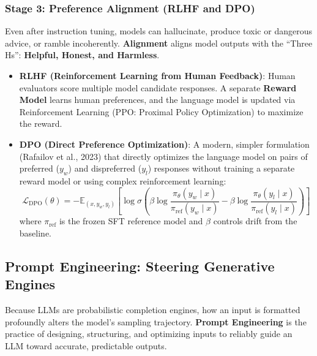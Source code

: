 \subsubsection{Stage 3: Preference Alignment (RLHF and DPO)}
Even after instruction tuning, models can hallucinate, produce toxic or dangerous advice, or ramble incoherently. \textbf{Alignment} aligns model outputs with the ``Three Hs'': \textbf{Helpful, Honest, and Harmless}.
\begin{itemize}
    \item \textbf{RLHF (Reinforcement Learning from Human Feedback)}: Human evaluators score multiple model candidate responses. A separate \textbf{Reward Model} learns human preferences, and the language model is updated via Reinforcement Learning (PPO: Proximal Policy Optimization) to maximize the reward.
    \item \textbf{DPO (Direct Preference Optimization)}: A modern, simpler formulation (Rafailov et al., 2023) that directly optimizes the language model on pairs of preferred ($y_w$) and dispreferred ($y_l$) responses without training a separate reward model or using complex reinforcement learning:
    \begin{equation}
    \mathcal{L}_{\text{DPO}}(\theta) = -\mathbb{E}_{(x, y_w, y_l)}\left[ \log \sigma\left( \beta \log \frac{\pi_\theta(y_w \mid x)}{\pi_{\text{ref}}(y_w \mid x)} - \beta \log \frac{\pi_\theta(y_l \mid x)}{\pi_{\text{ref}}(y_l \mid x)} \right) \right]\label{eq:dpo_loss}
    \end{equation}
    where $\pi_{\text{ref}}$ is the frozen SFT reference model and $\beta$ controls drift from the baseline.
\end{itemize}

\subsection{Prompt Engineering: Steering Generative Engines}\label{subsec:prompt_engineering}

Because LLMs are probabilistic completion engines, how an input is formatted profoundly alters the model's sampling trajectory. \textbf{Prompt Engineering} is the practice of designing, structuring, and optimizing inputs to reliably guide an LLM toward accurate, predictable outputs.


